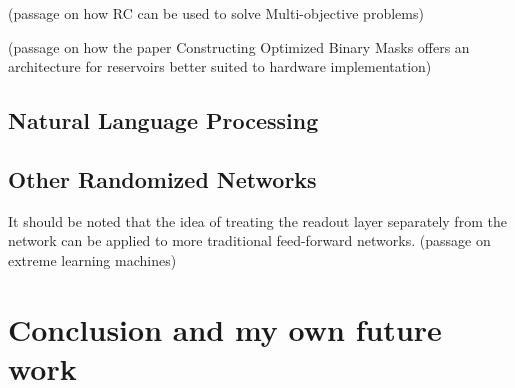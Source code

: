 \documentclass[12pt,oneside]{CUNY_CS_PhD}
\begin{document}
(passage on how RC can be used to solve Multi-objective problems)

(passage on how the paper Constructing Optimized Binary Masks offers an architecture for reservoirs better suited to hardware implementation)


\section{Natural Language Processing}


\section{Other Randomized Networks}
It should be noted that the idea of treating the readout layer separately from the network can be applied to more traditional feed-forward networks. 
(passage on extreme learning machines)

\chapter{Conclusion and my own future work}

\backmatter



\end{document}
